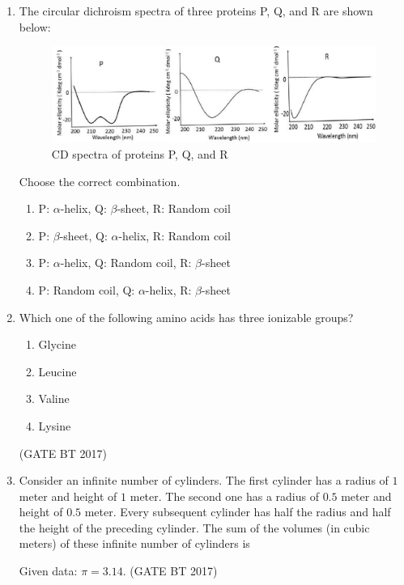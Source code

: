 \documentclass[journal,12pt,onecolumn]{IEEEtran}
\theoremstyle{remark}
\begin{document}
\begin{enumerate}
\item
The circular dichroism spectra of three proteins P, Q, and R are shown below:

\begin{figure}
  \centering
  \includegraphics[width=\columnwidth]{figs/cd_spectra.png}
  \caption{CD spectra of proteins P, Q, and R}
  \label{fig:cd_spectra}
\end{figure}

Choose the correct combination.

\begin{enumerate}
  \item P: $\alpha$-helix,\; Q: $\beta$-sheet,\; R: Random coil
  \item P: $\beta$-sheet,\; Q: $\alpha$-helix,\; R: Random coil
  \item P: $\alpha$-helix,\; Q: Random coil,\; R: $\beta$-sheet
  \item P: Random coil,\; Q: $\alpha$-helix,\; R: $\beta$-sheet
\end{enumerate}

\item Which one of the following amino acids has three ionizable groups?

\begin{enumerate}
    \item Glycine
    \item Leucine
    \item Valine
    \item Lysine
\end{enumerate}
\hfill (GATE BT 2017)

\item
Consider an infinite number of cylinders. The first cylinder has a radius of $1$ meter and height of $1$ meter. The second one has a radius of $0.5$ meter and height of $0.5$ meter. Every subsequent cylinder has half the radius and half the height of the preceding cylinder. The sum of the volumes (in cubic meters) of these infinite number of cylinders is 

Given data: $\pi = 3.14$.
\hfill (GATE BT 2017)


\end{enumerate}
\end{document}
